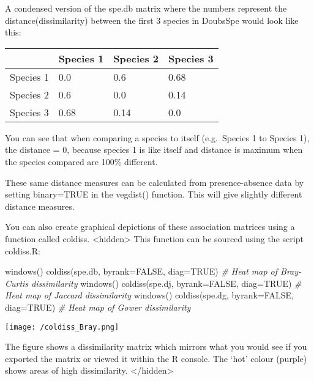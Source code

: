 \documentclass[
]{book}
\newenvironment{Shaded}{\begin{snugshade}}{\end{snugshade}}
\newcommand{\AttributeTok}[1]{\textcolor[rgb]{0.77,0.63,0.00}{#1}}
\newcommand{\CommentTok}[1]{\textcolor[rgb]{0.56,0.35,0.01}{\textit{#1}}}
\newcommand{\ConstantTok}[1]{\textcolor[rgb]{0.00,0.00,0.00}{#1}}
\newcommand{\FunctionTok}[1]{\textcolor[rgb]{0.00,0.00,0.00}{#1}}
\newcommand{\NormalTok}[1]{#1}
\begin{document}
A condensed version of the spe.db matrix where the numbers represent the
distance(dissimilarity) between the first 3 species in DoubsSpe would
look like this:

\begin{longtable}[]{@{}llll@{}}
\toprule
& Species 1 & Species 2 & Species 3\tabularnewline
\midrule
\endhead
Species 1 & 0.0 & 0.6 & 0.68\tabularnewline
Species 2 & 0.6 & 0.0 & 0.14\tabularnewline
Species 3 & 0.68 & 0.14 & 0.0\tabularnewline
\bottomrule
\end{longtable}

You can see that when comparing a species to itself (e.g.~Species 1 to
Species 1), the distance = 0, because species 1 is like itself and
distance is maximum when the species compared are 100\% different.

These same distance measures can be calculated from presence-absence
data by setting binary=TRUE in the vegdist() function. This will give
slightly different distance measures.

You can also create graphical depictions of these association matrices
using a function called coldiss. \textless hidden\textgreater{} This function can be sourced
using the script coldiss.R:

\begin{Shaded}
\begin{Highlighting}[]
\FunctionTok{windows}\NormalTok{()}
\FunctionTok{coldiss}\NormalTok{(spe.db, }\AttributeTok{byrank=}\ConstantTok{FALSE}\NormalTok{, }\AttributeTok{diag=}\ConstantTok{TRUE}\NormalTok{) }\CommentTok{\# Heat map of Bray{-}Curtis dissimilarity}
\FunctionTok{windows}\NormalTok{()}
\FunctionTok{coldiss}\NormalTok{(spe.dj, }\AttributeTok{byrank=}\ConstantTok{FALSE}\NormalTok{, }\AttributeTok{diag=}\ConstantTok{TRUE}\NormalTok{) }\CommentTok{\# Heat map of Jaccard dissimilarity}
\FunctionTok{windows}\NormalTok{() }
\FunctionTok{coldiss}\NormalTok{(spe.dg, }\AttributeTok{byrank=}\ConstantTok{FALSE}\NormalTok{, }\AttributeTok{diag=}\ConstantTok{TRUE}\NormalTok{) }\CommentTok{\# Heat map of Gower dissimilarity}
\end{Highlighting}
\end{Shaded}

\texttt{[image: /coldiss\_Bray.png]}

The figure shows a dissimilarity matrix which mirrors what you would see
if you exported the matrix or viewed it within the R console. The `hot'
colour (purple) shows areas of high dissimilarity. \textless/hidden\textgreater{}
\end{document}
